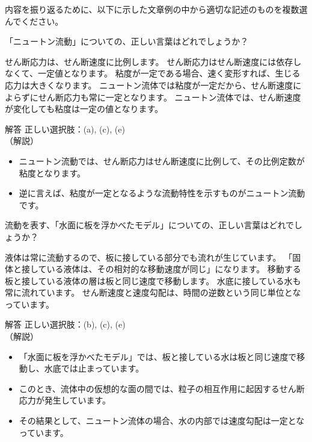 \documentclass[uplatex,dvipdfmx,a4paper,11pt]{jsarticle}
\begin{document}
内容を振り返るために、以下に示した文章例の中から適切な記述のものを複数選んでください。
\begin{qlist}
	\qitem 「ニュートン流動」についての、正しい言葉はどれでしょうか？
		\begin{qlist2}
			\qitem せん断応力は、せん断速度に比例します。
			\qitem せん断応力はせん断速度には依存しなくて、一定値となります。
			\qitem 粘度が一定である場合、速く変形すれば、生じる応力は大きくなります。
			\qitem ニュートン流体では粘度が一定だから、せん断速度によらずにせん断応力も常に一定となります。
			\qitem ニュートン流体では、せん断速度が変化しても粘度は一定の値となります。
		\end{qlist2}
		\vspace{3mm}
        \begin{itembox}[l]{解答}
            正しい選択肢：(a), (c), (e)\\
            （解説）
			\begin{itemize}
				\item ニュートン流動では、せん断応力はせん断速度に比例して、その比例定数が粘度となります。
				\item 逆に言えば、粘度が一定となるような流動特性を示すものがニュートン流動です。
			\end{itemize}
        \end{itembox}
	\qitem 流動を表す、「水面に板を浮かべたモデル」についての、正しい言葉はどれでしょうか？
		\begin{qlist2}
			\qitem 液体は常に流動するので、板に接している部分でも流れが生じています。
			\qitem 「固体と接している液体は、その相対的な移動速度が同じ」になります。
			\qitem 移動する板と接している液体の層は板と同じ速度で移動します。
			\qitem 水底に接している水も常に流れています。
			\qitem せん断速度と速度勾配は、時間の逆数という同じ単位となっています。
		\end{qlist2}
		\vspace{3mm}
        \begin{itembox}[l]{解答}
            正しい選択肢：(b), (c), (e)\\
            （解説）
			\begin{itemize}
				\item 「水面に板を浮かべたモデル」では、板と接している水は板と同じ速度で移動し、水底では止まっています。
				\item このとき、流体中の仮想的な面の間では、粒子の相互作用に起因するせん断応力が発生しています。
				\item その結果として、ニュートン流体の場合、水の内部では速度勾配は一定となっています。

\end{itemize}
\end{itembox}
\end{qlist}
\end{document}
